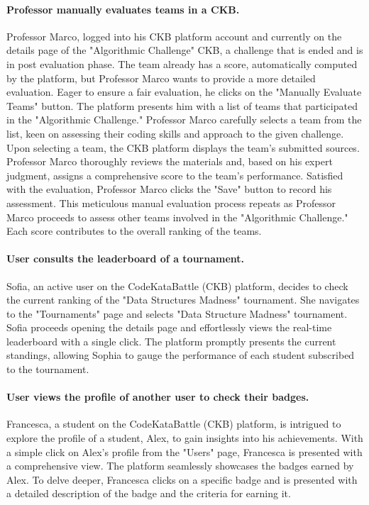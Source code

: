 \paragraph*{Professor manually evaluates teams in a CKB.}
Professor Marco, logged into his CKB platform account and currently on the details page of the "Algorithmic Challenge" CKB, a challenge that is ended and is in post evaluation phase.
The team already has a score, automatically computed by the platform, but Professor Marco wants to provide a more detailed evaluation. 
Eager to ensure a fair evaluation, he clicks on the "Manually Evaluate Teams" button.
The platform presents him with a list of teams that participated in the "Algorithmic Challenge." 
Professor Marco carefully selects a team from the list, keen on assessing their coding skills and approach to the given challenge.
Upon selecting a team, the CKB platform displays the team's submitted sources. 
Professor Marco thoroughly reviews the materials and, based on his expert judgment, assigns a comprehensive score to the team's performance.
Satisfied with the evaluation, Professor Marco clicks the "Save" button to record his assessment. 
This meticulous manual evaluation process repeats as Professor Marco proceeds to assess other teams involved in the "Algorithmic Challenge." 
Each score contributes to the overall ranking of the teams.

\paragraph*{User consults the leaderboard of a tournament.}
Sofia, an active user on the CodeKataBattle (CKB) platform, decides to check the current ranking of the "Data Structures Madness" tournament. 
She navigates to the "Tournaments" page and selects "Data Structure Madness" tournament.
Sofia proceeds opening the details page and effortlessly views the real-time leaderboard with a single click. 
The platform promptly presents the current standings, allowing Sophia to gauge the performance of each student subscribed to the tournament.

\paragraph*{User views the profile of another user to check their badges.}
Francesca, a student on the CodeKataBattle (CKB) platform, is intrigued to explore the profile of a student, Alex, to gain insights into his achievements. 
With a simple click on Alex's profile from the "Users" page, Francesca is presented with a comprehensive view. 
The platform seamlessly showcases the badges earned by Alex. 
To delve deeper, Francesca clicks on a specific badge and is presented with a detailed description of the badge and the criteria for earning it.

